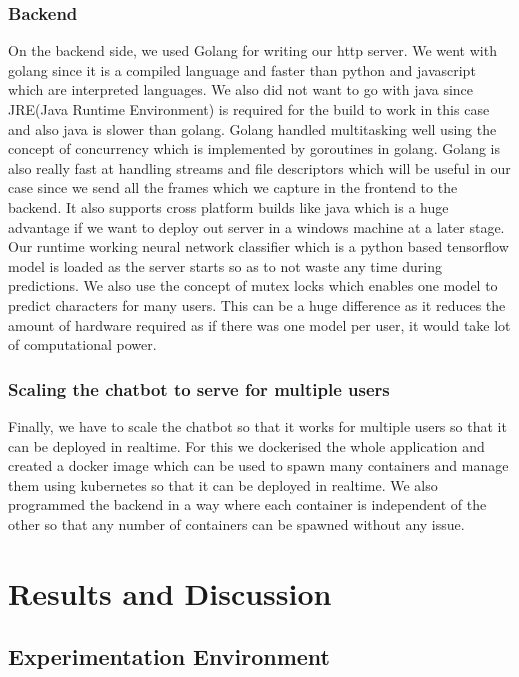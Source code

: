 \documentclass[12pt,a4paper]{report}
\begin{document}
\subsubsection{Backend}
On the backend side, we used Golang for writing our http server. We went with golang since it is a compiled language and faster than python and javascript which are interpreted languages. We also did not want to go with java since JRE(Java Runtime Environment) is required for the build to work in this case and also java is slower than golang. Golang handled multitasking well using the concept of concurrency which is implemented by goroutines in golang. Golang is also really fast at handling streams and file descriptors which will be useful in our case since we send all the frames which we capture in the frontend to the backend. It also supports cross platform builds like java which is a huge advantage if we want to deploy out server in a windows machine at a later stage. Our runtime working neural network classifier which is a python based tensorflow model is loaded as the server starts so as to not waste any time during predictions. We also use the concept of mutex locks which enables one model to predict characters for many users. This can be a huge difference as it reduces the amount of hardware required as if there was one model per user, it would take lot of computational power.

\subsubsection{Scaling the chatbot to serve for multiple users}
Finally, we have to scale the chatbot so that it works for multiple users so that it can be deployed in realtime. For this we dockerised the whole application and created a docker image which can be used to spawn many containers and manage them using kubernetes so that it can be deployed in realtime. We also programmed the backend in a way where each container is independent of the other so that any number of containers can be spawned without any issue.

\section{Results and Discussion}

\subsection{Experimentation Environment}
\end{document}
